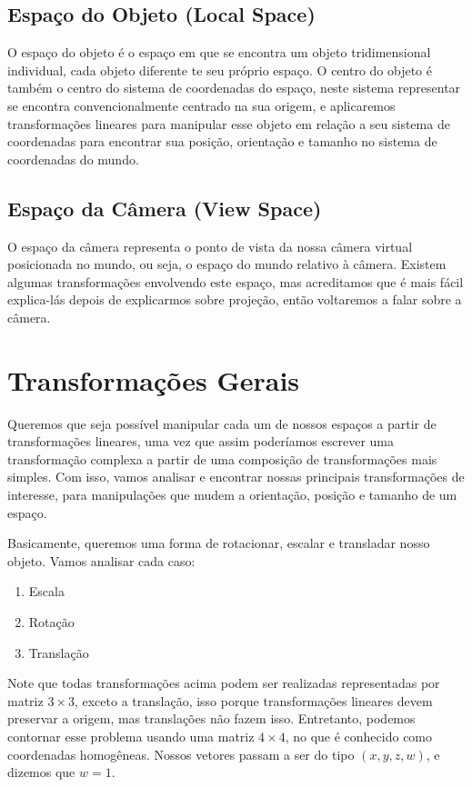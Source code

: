 \documentclass[12pt]{article}
\begin{document}
\subsection{Espaço do Objeto (Local Space)}

O espaço do objeto é o espaço em que se encontra um objeto tridimensional individual, cada objeto diferente te seu próprio espaço. O centro do objeto é também o centro do sistema de coordenadas do espaço, 
 neste sistema representar se encontra convencionalmente centrado na sua origem, e aplicaremos transformações lineares para manipular esse objeto em relação a seu sistema de coordenadas para encontrar sua posição, orientação e tamanho no sistema de coordenadas do mundo. 


\subsection{Espaço da Câmera (View Space)}

O espaço da câmera representa o ponto de vista da nossa câmera virtual posicionada no mundo, ou seja, o espaço do mundo relativo à câmera. Existem algumas transformações envolvendo este espaço, mas acreditamos que é mais fácil explica-lás depois de explicarmos sobre projeção, então voltaremos a falar sobre a câmera. 

\section{Transformações Gerais}

Queremos que seja possível manipular cada um de nossos espaços a partir de transformações lineares, uma vez que assim poderíamos escrever uma transformação complexa a partir de uma composição de transformações mais simples. Com isso, vamos analisar e encontrar nossas principais transformações de interesse, para manipulações que mudem a orientação, posição e tamanho de um espaço.

Basicamente, queremos uma forma de rotacionar, escalar e transladar nosso objeto.
Vamos analisar cada caso:

\begin{enumerate}[noitemsep]
    \item Escala
    \item Rotação
    \item Translação
\end{enumerate}

Note que todas transformações acima podem ser realizadas representadas por matriz $3\times3$, exceto a translação, isso porque transformações lineares devem preservar a origem, mas translações não fazem isso. Entretanto, podemos contornar esse problema usando uma matriz $4\times4$, no que é conhecido como coordenadas homogêneas. Nossos vetores passam a ser do tipo $(x, y, z, w)$, e dizemos que $w = 1$.
\end{document}
